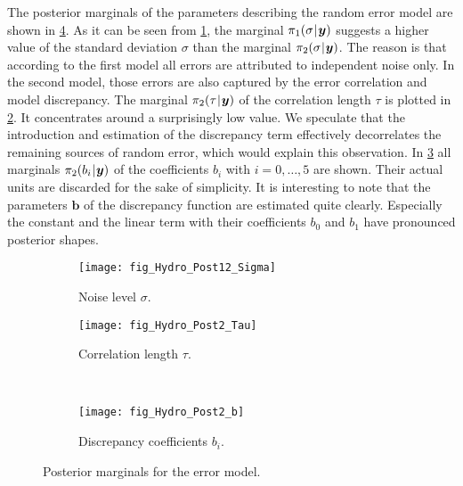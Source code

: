 \par %
The posterior marginals of the parameters describing the random error model are shown in \cref{fig:Hydro:Post:ErrorModel}.
As it can be seen from \cref{fig:Hydro:Post:Sigma}, the marginal \(\pi_1(\sigma {\:\!}|{\:\!} \bm{y})\)
suggests a higher value of the standard deviation \(\sigma\) than the marginal \(\pi_2(\sigma {\:\!}|{\:\!} \bm{y})\).
The reason is that according to the first model all errors are attributed to independent noise only.
In the second model, those errors are also captured by the error correlation and model discrepancy.
The marginal \(\pi_2(\tau {\:\!}|{\:\!} \bm{y})\) of the correlation length \(\tau\) is plotted in \cref{fig:Hydro:Post:Tau}.
It concentrates around a surprisingly low value.
We speculate that the introduction and estimation of the discrepancy term effectively decorrelates the remaining sources of random error, which would explain this observation.
In \cref{fig:Hydro:Post:DiscrepancyModel} all marginals \(\pi_2(b_i {\:\!}|{\:\!} \bm{y})\) of the coefficients \(b_i\) with \(i=0,\ldots,5\) are shown.
Their actual units are discarded for the sake of simplicity.
It is interesting to note that the parameters \(\bm{b}\) of the discrepancy function are estimated quite clearly.
Especially the constant and the linear term with their coefficients \(b_0\) and \(b_1\) have pronounced posterior shapes.
\begin{figure}[htbp]
  \centering
  \begin{subfigure}[b]{\HYDROsubWidth}
    \centering
    \texttt{[image: fig\_Hydro\_Post12\_Sigma]}
    \caption{Noise level \(\sigma\).}
    \label{fig:Hydro:Post:Sigma}
  \end{subfigure}\hfill%
  \begin{subfigure}[b]{\HYDROsubWidth}
    \centering
    \texttt{[image: fig\_Hydro\_Post2\_Tau]}
    \caption{Correlation length \(\tau\).}
    \label{fig:Hydro:Post:Tau}
  \end{subfigure}\\[1.5ex]%
  \begin{subfigure}[b]{\HYDROsubWidth}
    \centering
    \texttt{[image: fig\_Hydro\_Post2\_b]}
    \caption{Discrepancy coefficients \(b_i\).}
    \label{fig:Hydro:Post:DiscrepancyModel}
  \end{subfigure}%
  \caption[Posterior marginals for the error model]{Posterior marginals for the error model.}
  \label{fig:Hydro:Post:ErrorModel}
\end{figure}
